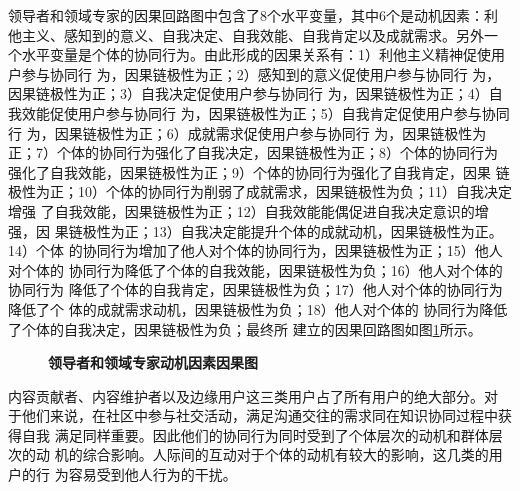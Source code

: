 领导者和领域专家的因果回路图中包含了8个水平变量，其中6个是动机因素：利
他主义、感知到的意义、自我决定、自我效能、自我肯定以及成就需求。另外一
个水平变量是个体的协同行为。由此形成的因果关系有：1）利他主义精神促使用户参与协同行
为，因果链极性为正；2）感知到的意义促使用户参与协同行
为，因果链极性为正；3）自我决定促使用户参与协同行
为，因果链极性为正；4）自我效能促使用户参与协同行
为，因果链极性为正；5）自我肯定促使用户参与协同行
为，因果链极性为正；6）成就需求促使用户参与协同行
为，因果链极性为正；7）个体的协同行为强化了自我决定，因果链极性为正；8）个体的协同行为
强化了自我效能，因果链极性为正；9）个体的协同行为强化了自我肯定，因果
链极性为正；10）个体的协同行为削弱了成就需求，因果链极性为负；11）自我决定增强
了自我效能，因果链极性为正；12）自我效能能偶促进自我决定意识的增强，因
果链极性为正；13）自我决定能提升个体的成就动机，因果链极性为正。14）个体
的协同行为增加了他人对个体的协同行为，因果链极性为正；15）他人对个体的
协同行为降低了个体的自我效能，因果链极性为负；16）他人对个体的协同行为
降低了个体的自我肯定，因果链极性为负；17）他人对个体的协同行为降低了个
体的成就需求动机，因果链极性为负；18）他人对个体的
协同行为降低了个体的自我决定，因果链极性为负；最终所
建立的因果回路图如图\ref{fig:motive1}所示。
\begin{figure}[htb]
  \centering
  \caption{\small{\textbf{领导者和领域专家动机因素因果图}}}
  \label{fig:motive1}
\end{figure}

内容贡献者、内容维护者以及边缘用户这三类用户占了所有用户的绝大部分。对
于他们来说，在社区中参与社交活动，满足沟通交往的需求同在知识协同过程中获得自我
满足同样重要。因此他们的协同行为同时受到了个体层次的动机和群体层次的动
机的综合影响。人际间的互动对于个体的动机有较大的影响，这几类的用户的行
为容易受到他人行为的干扰。

